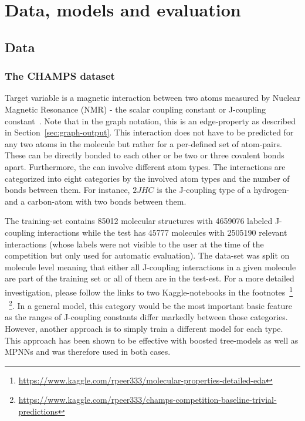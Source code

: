 \chapter{Data, models and evaluation}
\label{chapter:Methods}


\section{Data}
\label{sec:data-and-features}


\subsection{The CHAMPS dataset}
\label{sec:champs-dataset}

Target variable is a magnetic interaction between two atoms measured by Nuclear Magnetic Resonance (NMR) - the scalar coupling constant or J-coupling constant~\cite{NMR}.
Note that in the graph notation, this is an edge-property as described in Section~\ref{sec:graph-output}. This interaction does not have to be predicted for any two atoms in the molecule but rather for a per-defined set of atom-pairs. These can be directly bonded to each other or be two or three covalent bonds apart. Furthermore, the can involve different atom types. The interactions are categorized into eight categories by the involved atom types and the number of bonds between them. For instance, $2JHC$ is the J-coupling type of a hydrogen- and a carbon-atom with two bonds between them.

The training-set contains 85012 molecular structures with 4659076 labeled J-coupling interactions while the test has 45777 molecules with 2505190 relevant interactions (whose labels were not visible to the user at the time of the competition but only used for automatic evaluation). The data-set was split on molecule level meaning that either all J-coupling interactions in a given molecule are part of the training set or all of them are in the test-est. For a more detailed investigation, please follow the links to two Kaggle-notebooks in the footnotes~\footnote{\url{https://www.kaggle.com/rpeer333/molecular-properties-detailed-eda}}
~\footnote{\url{https://www.kaggle.com/rpeer333/champs-competition-baseline-trivial-predictions}}.
In a general model, this category would be the most important basic feature as the ranges of J-coupling constants differ markedly between those categories. However, another approach is to simply train a different model for each type. This approach has been shown to be effective with boosted tree-models as well as MPNNs and was therefore used in both cases.

